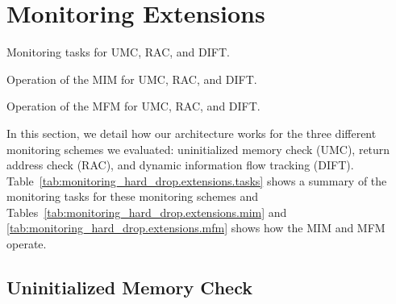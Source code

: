 \section{Monitoring Extensions}
\label{sec:monitoring_hard_drop.extensions}

\begin{table}
  \begin{center}
    \caption{Monitoring tasks for UMC, RAC, and DIFT.}
    \begin{footnotesize}
    
    \end{footnotesize}
    \label{tab:monitoring_hard_drop.extensions.tasks}
  \end{center}
\end{table}

\begin{table}
  \begin{center}
    \caption{Operation of the MIM for UMC, RAC, and DIFT.}
    \begin{footnotesize}
    
    \end{footnotesize}
    \label{tab:monitoring_hard_drop.extensions.mim}
  \end{center}
\end{table}
\begin{table}
  \begin{center}
    \caption{Operation of the MFM for UMC, RAC, and DIFT.}
    \begin{footnotesize}
    
    \end{footnotesize}
    \label{tab:monitoring_hard_drop.extensions.mfm}
  \end{center}
\end{table}

In this section, we detail how our architecture works for the three different
monitoring schemes we evaluated: uninitialized memory check (UMC), return
address check (RAC), and dynamic information flow tracking (DIFT).
Table~\ref{tab:monitoring_hard_drop.extensions.tasks} shows a summary of the
monitoring tasks for these monitoring schemes and
Tables~\ref{tab:monitoring_hard_drop.extensions.mim} and
\ref{tab:monitoring_hard_drop.extensions.mfm} shows how the MIM and MFM
operate. 

\subsection{Uninitialized Memory Check}
\label{sec:monitoring_hard_drop.extensions.umc}

